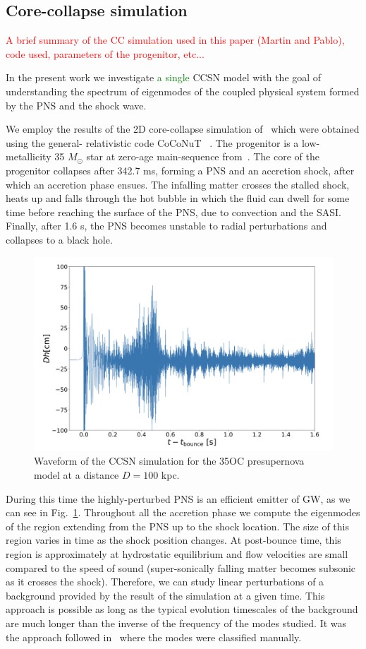 \documentclass[fleqn,usenatbib]{mnras}
\begin{document}
\subsection{Core-collapse simulation}
\textcolor{red}{A brief summary of the CC simulation used in this paper (Martin and Pablo), code used, parameters of the progenitor, etc...}

In the present work we investigate \textcolor{green}{a single} CCSN model with the goal of understanding the spectrum of eigenmodes of the coupled physical system formed by the PNS and the shock wave. 

We employ the results of the 2D core-collapse simulation of~\cite{} which were obtained using the general- relativistic code CoCoNuT ~\cite{}. The progenitor is a low-metallicity 35 $M_\odot $ star at zero-age main-sequence from~\cite{}. The core of the progenitor collapses after 342.7 ms, forming a PNS and an accretion shock, after which an accretion phase ensues. The infalling matter crosses the stalled shock, heats up and falls through the hot bubble in which the fluid can dwell for some time before reaching the surface of the PNS, due to convection and the SASI. Finally, after 1.6 s, the PNS becomes unstable to radial perturbations and collapses to a black hole. 
\begin{figure}
    \centering
	\includegraphics[height= 5.5 cm]{350C_model.png}
	\caption{\label{fig:350} Waveform of the CCSN simulation for the 35OC presupernova model at a distance $D = 100$ kpc.}
\end{figure}

During this time the highly-perturbed PNS is an efficient emitter of GW, as we can see in Fig.~\ref{fig:350}. Throughout all the accretion phase we compute the eigenmodes of the region extending from the PNS up to the shock location. The size of this region varies in time as the shock position changes. At post-bounce time, this region is approximately at hydrostatic equilibrium and flow velocities are small compared to the speed of sound (super-sonically falling matter becomes subsonic as it crosses the shock). Therefore, we can study linear perturbations of a background provided by the result of the simulation at a given time. This approach is possible as long as the typical evolution timescales of the background are much longer than the inverse of the frequency of the modes studied. It was the approach followed in~\cite{} where the modes were classified manually.
\end{document}
